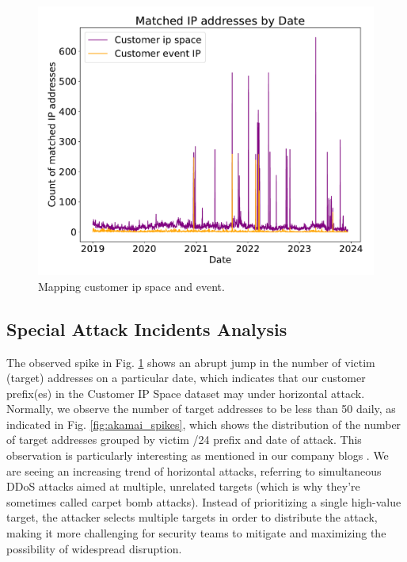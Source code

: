 \begin{figure}[htbp]
    \centering
    \includegraphics[scale=0.30]{graphs/matched_customer_graph.pdf}
    \caption{Mapping customer ip space and event.}
    \label{fig:mappedcustomergraph}
\end{figure}


\subsection{Special Attack Incidents Analysis}\label{sec:attackeventsfromcustomeripspace}
The observed spike in Fig. \ref{fig:mappedcustomergraph} shows an abrupt jump in the number of victim (target) addresses on a particular date, which indicates that our customer prefix(es) in the Customer IP Space dataset may under horizontal attack. Normally, we observe the number of target addresses to be less than 50 daily, as indicated in Fig. \ref{fig:akamai_spikes}, which shows the distribution of the number of target addresses grouped by victim /24 prefix and date of attack. This observation is particularly interesting as mentioned in our company blogs \cite{Birchard2022DDoS}. We are seeing an increasing trend of horizontal attacks, referring to simultaneous DDoS attacks aimed at multiple, unrelated targets (which is why they’re sometimes called carpet bomb attacks). Instead of prioritizing a single high-value target, the attacker selects multiple targets in order to distribute the attack, making it more challenging for security teams to mitigate and maximizing the possibility of widespread disruption. 

